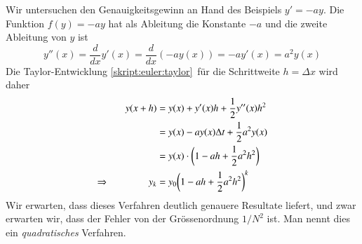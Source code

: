 Wir untersuchen den Genauigkeitsgewinn an Hand des Beispiels $y'=-ay$.
Die Funktion $f(y) = -ay$ hat als Ableitung die Konstante $-a$ und
die zweite Ableitung von $y$ ist
\[
y''(x) = \frac{d}{dx} y'(x) = \frac{d}{dx} (-ay(x)) = -ay'(x)=a^2 y(x)
\]
Die Taylor-Entwicklung \eqref{skript:euler:taylor} für die Schrittweite
$h=\Delta x$ wird daher
\begin{align}
y(x+h)
&=
y(x) + y'(x)h + \frac12y''(x)h^2
\notag
\\
&= y(x) - ay(x)\Delta t + \frac12 a^2 y(x)
\notag
\\
&= y(x)\cdot \biggl(1-ah+\frac12 a^2h^2\biggr)
\notag
\\
\Rightarrow\qquad\qquad
y_k&=y_0\biggl(1-ah+\frac12 a^2h^2\biggr)^k
\label{skript:euler:beschleunigt}
\end{align}
Wir erwarten, dass dieses Verfahren deutlich genauere Resultate liefert,
und zwar erwarten wir, dass der Fehler von der Grössenordnung $1/N^2$ ist.
Man nennt dies ein {\em quadratisches} Verfahren.

